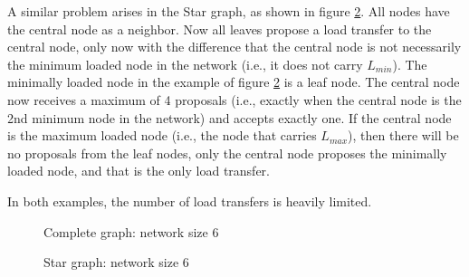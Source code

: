 A similar problem arises in the Star graph, as shown in figure \ref{fig:specialstargraphDemo}. All nodes have the central node as a neighbor. Now all leaves propose a load transfer to the central node, only now with the difference that the central node is not necessarily the minimum loaded node in the network (i.e., it does not carry $L_{min}$). The minimally loaded node in the example of figure \ref{fig:specialstargraphDemo} is a leaf node. The central node now receives a maximum of 4 proposals (i.e., exactly when the central node is the 2nd minimum node in the network) and accepts exactly one. If the central node is the maximum loaded node (i.e., the node that carries $L_{max}$), then there will be no proposals from the leaf nodes, only the central node proposes the minimally loaded node, and that is the only load transfer.

In both examples, the number of load transfers is heavily limited.
\begin{figure}[]
    \centering
    
    \caption{Complete graph: network size 6}
    \label{fig:specialcompletegraphDemo}
\end{figure}
\begin{figure}[]
    \centering
    
    \caption{Star graph: network size 6}
    \label{fig:specialstargraphDemo}
\end{figure}